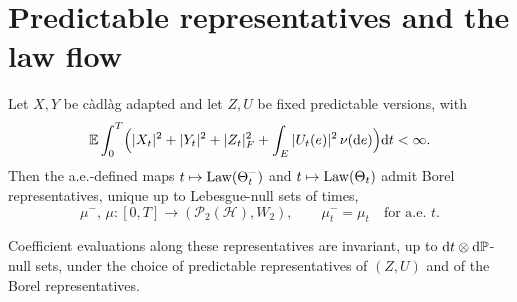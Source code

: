 \clearpage
\appendix
\section{Predictable representatives and the law flow}\label{app:lawflow}

\begin{lemma}\label{lem:lawflow}
Let $X,Y$ be c\`adl\`ag adapted and let $Z,U$ be fixed predictable versions, with
\[
\mathbb{E}\int_0^T\Bigl(|X_t|^2+|Y_t|^2+|Z_t|_F^2+\int_E|U_t(e)|^2\,\nu(\mathrm{d} e)\Bigr)\mathrm{d} t
<\infty .
\]
Then the a.e.-defined maps
$t\mapsto\mathrm{Law}(\Theta_t^-)$ and $t\mapsto\mathrm{Law}(\Theta_t)$ admit Borel representatives,
unique up to Lebesgue-null sets of times,
\[
\mu^-,\,\mu:[0,T]\to(\mathcal P_2(\mathcal H),W_2),
\qquad
\mu_t^-=\mu_t\quad\text{for a.e.\ }t .
\]

Coefficient evaluations along these representatives are invariant, up to
$\mathrm{d} t\otimes\mathrm{d}\mathbb{P}$-null sets, under the choice of predictable representatives of
$(Z,U)$ and of the Borel representatives.
\end{lemma}
